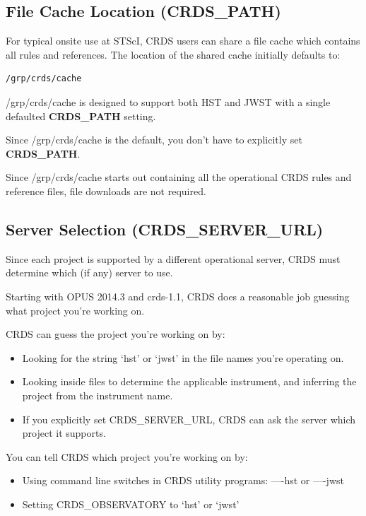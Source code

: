 \documentclass[letterpaper,10pt,english]{sphinxmanual}
\begin{document}
\subsection{File Cache Location (CRDS\_PATH)}
\label{installation:file-cache-location-crds-path}
For typical onsite use at STScI, CRDS users can share a file cache which contains all rules and references.  The
location of the shared cache initially defaults to:

\begin{Verbatim}[commandchars=\\\{\}]
/grp/crds/cache
\end{Verbatim}

/grp/crds/cache is designed to support both HST and JWST with a single defaulted \textbf{CRDS\_PATH} setting.

Since /grp/crds/cache is the default,  you don't have to explicitly set \textbf{CRDS\_PATH}.

Since /grp/crds/cache starts out containing all the operational CRDS rules and reference files, file downloads
are not required.


\subsection{Server Selection (CRDS\_SERVER\_URL)}
\label{installation:server-selection-crds-server-url}
Since each project is supported by a different operational server, CRDS must determine which (if any)
server to use.

Starting with OPUS 2014.3 and crds-1.1,  CRDS does a reasonable job guessing what project you're working on.

CRDS can guess the project you're working on by:
\begin{itemize}
\item {} 
Looking for the string `hst' or `jwst' in the file names you're operating on.

\item {} 
Looking inside files to determine the applicable instrument, and inferring the project from the instrument name.

\item {} 
If you explicitly set CRDS\_SERVER\_URL,  CRDS can ask the server which project it supports.

\end{itemize}

You can tell CRDS which project you're working on by:
\begin{itemize}
\item {} 
Using command line switches in CRDS utility programs:  ----hst or ----jwst

\item {} 
Setting CRDS\_OBSERVATORY to `hst' or `jwst'

\end{itemize}
\end{document}
